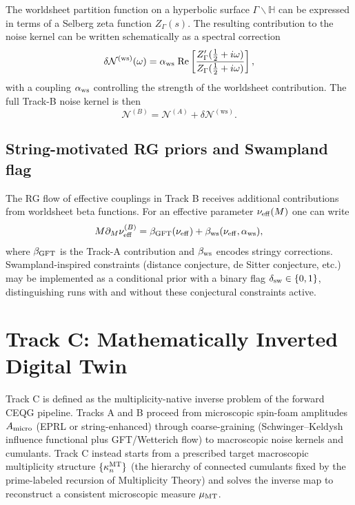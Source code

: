 \documentclass[11pt]{article}
\begin{document}
The worldsheet partition function on a hyperbolic surface $\Gamma\backslash\mathbb{H}$ can be expressed in terms of a Selberg zeta function $Z_\Gamma(s)$. The resulting contribution to the noise kernel can be written schematically as a spectral correction
\begin{equation}
  \delta \mathcal{N}^{(\mathrm{ws})}(\omega)
  = \alpha_{\rm ws}\; \mathrm{Re}\left[\frac{Z_\Gamma'(\tfrac{1}{2} + i\omega)}{Z_\Gamma(\tfrac{1}{2} + i\omega)}\right],
\end{equation}
with a coupling $\alpha_{\rm ws}$ controlling the strength of the worldsheet contribution. The full Track-B noise kernel is then
\begin{equation}
  \mathcal{N}^{(B)} = \mathcal{N}^{(A)} + \delta \mathcal{N}^{(\mathrm{ws})}.
\end{equation}

\subsection{String-motivated RG priors and Swampland flag}

The RG flow of effective couplings in Track B receives additional contributions from worldsheet beta functions. For an effective parameter $\nu_{\rm eff}(M)$ one can write
\begin{equation}
  M\partial_M \nu_{\rm eff}^{(B)}
  = \beta_{\rm GFT}(\nu_{\rm eff}) + \beta_{\rm ws}(\nu_{\rm eff}, \alpha_{\rm ws}),
\end{equation}
where $\beta_{\rm GFT}$ is the Track-A contribution and $\beta_{\rm ws}$ encodes stringy corrections. Swampland-inspired constraints (distance conjecture, de Sitter conjecture, etc.) may be implemented as a conditional prior with a binary flag $\delta_{\rm sw} \in \{0,1\}$, distinguishing runs with and without these conjectural constraints active.

\section{Track C: Mathematically Inverted Digital Twin}

Track C is defined as the multiplicity-native inverse problem of the forward CEQG pipeline. Tracks A and B proceed from microscopic spin-foam amplitudes $A_{\rm micro}$ (EPRL or string-enhanced) through coarse-graining (Schwinger--Keldysh influence functional plus GFT/Wetterich flow) to macroscopic noise kernels and cumulants. Track C instead starts from a prescribed target macroscopic multiplicity structure $\{\kappa_n^{\rm MT}\}$ (the hierarchy of connected cumulants fixed by the prime-labeled recursion of Multiplicity Theory) and solves the inverse map to reconstruct a consistent microscopic measure $\mu_{\rm MT}$.
\end{document}
